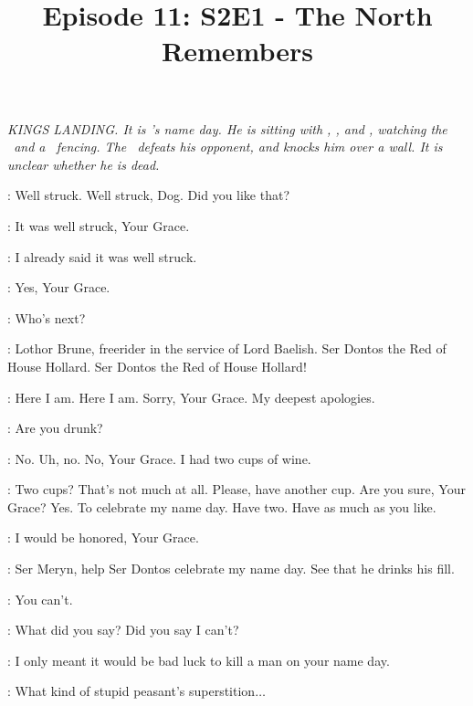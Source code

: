 

\title{Episode 11: S2E1 - The North Remembers}
\author{}
\date{}
\maketitle




\scene

\textit{KINGS LANDING. It is \JOFFREY's name day.  He is sitting with \SANSA, \TOMMEN, and \MYRCELLA, watching the \HOUND ~and a \KNIGHT ~fencing.  The \HOUND ~defeats his opponent, and knocks him over a wall.  It is unclear whether he is dead.}

\JOFFREY: Well struck. Well struck, Dog.  Did you like that?

\SANSA: It was well struck, Your Grace.

\JOFFREY: I already said it was well struck.

\SANSA: Yes, Your Grace.

\JOFFREY: Who's next?

\HERALD: Lothor Brune, freerider in the service of Lord Baelish. Ser Dontos the Red of House Hollard.  Ser Dontos the Red of House Hollard!


\DONTOS: Here I am. Here I am. Sorry, Your Grace. My deepest apologies.

\JOFFREY: Are you drunk?

\DONTOS: No. Uh, no. No, Your Grace. I had two cups of wine.

\JOFFREY: Two cups? That's not much at all. Please, have another cup. Are you sure, Your Grace? Yes. To celebrate my name day. Have two. Have as much as you like.

\DONTOS: I would be honored, Your Grace.

\JOFFREY: Ser Meryn, help Ser Dontos celebrate my name day. See that he drinks his fill.


\SANSA: You can't.

\JOFFREY: What did you say? Did you say I can't?

\SANSA: I only meant it would be bad luck to kill a man on your name day.

\JOFFREY: What kind of stupid peasant's superstition$\ldots$

